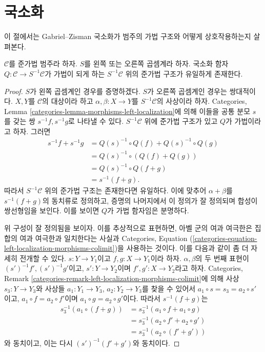 \section{국소화}
\label{section-localization}

\noindent
이 절에서는 Gabriel--Zisman 국소화가 범주의 가법 구조와 어떻게
상호작용하는지 살펴본다.

\begin{lemma}
\label{lemma-localization-preadditive}
$\mathcal{C}$를 준가법 범주라 하자.
$S$를 왼쪽 또는 오른쪽 곱셈계라 하자.
국소화 함자 $Q : \mathcal{C} \to S^{-1}\mathcal{C}$가 가법이 되게 하는
$S^{-1}\mathcal{C}$ 위의 준가법 구조가 유일하게 존재한다.
\end{lemma}

\begin{proof}
$S$가 왼쪽 곱셈계인 경우를 증명하겠다.
$S$가 오른쪽 곱셈계인 경우는 쌍대적이다.
$X, Y$를 $\mathcal{C}$의 대상이라 하고
$\alpha, \beta : X \to Y$를 $S^{-1}\mathcal{C}$의 사상이라 하자.
Categories, Lemma
\ref{categories-lemma-morphisms-left-localization}에 의해 이들을 공통 분모
$s$를 갖는 쌍 $s^{-1}f, s^{-1}g$로 나타낼 수 있다.
$S^{-1}\mathcal{C}$ 위에 준가법 구조가 있고 $Q$가 가법이라고 하자.
그러면
\begin{align*}
s^{-1}f+s^{-1}g
&=Q(s)^{-1}\circ Q(f)+Q(s)^{-1}\circ Q(g)\\
&=Q(s)^{-1}\circ(Q(f)+Q(g))\\
&=Q(s)^{-1}\circ Q(f+g)\\
&=s^{-1}(f+g).
\end{align*}
따라서 $S^{-1}\mathcal{C}$ 위의 준가법 구조는 존재한다면 유일하다.
이에 맞추어 $\alpha + \beta$를 $s^{-1}(f + g)$의 동치류로 정의하고,
증명의 나머지에서 이 정의가 잘 정의되며 합성이 쌍선형임을 보인다.
이를 보이면 $Q$가 가법 함자임은 분명하다.

\medskip\noindent
위 구성이 잘 정의됨을 보이자. 이를 추상적으로 표현하면, 아벨 군의
여과 여극한은 집합의 여과 여극한과 일치한다는 사실과 Categories,
Equation (\ref{categories-equation-left-localization-morphisms-colimit})을
사용하는 것이다. 이를 다음과 같이 좀 더 자세히 전개할 수 있다.
$s : Y \to Y_1$이고 $f, g : X \to Y_1$이라 하자.
$\alpha, \beta$의 두 번째 표현이 $(s')^{-1}f', (s')^{-1}g'$이고,
$s' : Y \to Y_2$이며 $f', g' : X \to Y_2$라고 하자.
Categories, Remark
\ref{categories-remark-left-localization-morphisms-colimit}에 의해 사상
$s_3 : Y \to Y_3$와 사상들
$a_1 : Y_1 \to Y_3$, $a_2 : Y_2 \to Y_3$를 찾을 수 있어서
$a_1 \circ s = s_3 = a_2 \circ s'$이고,
$a_1 \circ f = a_2 \circ f'$이며 $a_1 \circ g = a_2 \circ g'$이다.
따라서 $s^{-1}(f + g)$는
\begin{align*}
s_3^{-1}(a_1 \circ (f + g)) & =
s_3^{-1}(a_1 \circ f + a_1 \circ g) \\
& = s_3^{-1}(a_2 \circ f' + a_2 \circ g') \\
& = s_3^{-1}(a_2 \circ (f' + g'))
\end{align*}
와 동치이고, 이는 다시 $(s')^{-1}(f' + g')$와 동치이다.


\end{proof}
